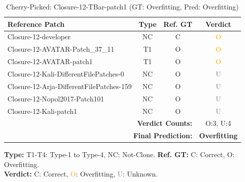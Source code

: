 \begin{table}[t]
\centering
\caption{Cherry-Picked: Closure-12-TBar-patch1 (GT: Overfitting, Pred: Overfitting)}
\label{tab:cherry-Closure12TBarpatch1}
\footnotesize
\renewcommand{\arraystretch}{1.1}
\setlength{\tabcolsep}{4pt}
\begin{tabular}{l|c|c|c}
\hline
\textbf{Reference Patch} & \textbf{Type} & \textbf{Ref. GT} & \textbf{Verdict} \\
\hline
Closure-12-developer & NC & C & \textcolor{orange}{O} \\
Closure-12-AVATAR-Patch\_37\_11 & T1 & O & \textcolor{orange}{O} \\
Closure-12-AVATAR-patch1 & T1 & O & \textcolor{orange}{O} \\
Closure-12-Kali-DifferentFilePatches-0 & NC & O & \textcolor{gray}{U} \\
Closure-12-Arja-DifferentFilePatches-159 & NC & O & \textcolor{gray}{U} \\
Closure-12-Nopol2017-Patch101 & NC & O & \textcolor{gray}{U} \\
Closure-12-Kali-patch1 & NC & O & \textcolor{gray}{U} \\
\hline
\multicolumn{3}{r|}{\textbf{Verdict Counts:}} & O:3, U:4 \\
\multicolumn{3}{r|}{\textbf{Final Prediction:}} & \textbf{Overfitting} \\
\hline
\end{tabular}
\vspace{1mm}
\parbox{\linewidth}{\centering\footnotesize 
\vspace{1mm}
\textbf{Type:} T1-T4: Type-1 to Type-4, NC: Not-Clone. \;
\textbf{Ref. GT:} C: Correct, O: Overfitting. \\
\textbf{Verdict:} \textcolor{green!60!black}{C}: Correct, \textcolor{orange}{O}: Overfitting, \textcolor{gray}{U}: Unknown.}
\end{table}


